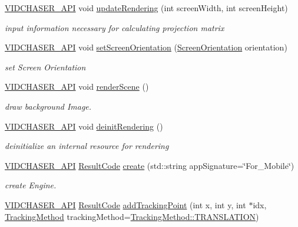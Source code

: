 \begin{DoxyCompactItemize}
\hyperlink{_vid_chaser_a_p_i_8h_abe868bb94e22f611aece5087695f9ef3}{V\+I\+D\+C\+H\+A\+S\+E\+R\+\_\+\+A\+PI} void \hyperlink{namespace_vid_chaser_afbfe1bf77862004fd5da9c95194cc506}{update\+Rendering} (int screen\+Width, int screen\+Height)
\begin{DoxyCompactList}\small\item\em input information necessary for calculating projection matrix \end{DoxyCompactList}\item 
\hyperlink{_vid_chaser_a_p_i_8h_abe868bb94e22f611aece5087695f9ef3}{V\+I\+D\+C\+H\+A\+S\+E\+R\+\_\+\+A\+PI} void \hyperlink{namespace_vid_chaser_a76a9d325e6621b9c163c5154db3f3141}{set\+Screen\+Orientation} (\hyperlink{_vid_chaser_define_8h_a5af96ebe9fdc47f01c3989cf97d41a77}{Screen\+Orientation} orientation)
\begin{DoxyCompactList}\small\item\em set Screen Orientation \end{DoxyCompactList}\item 
\hyperlink{_vid_chaser_a_p_i_8h_abe868bb94e22f611aece5087695f9ef3}{V\+I\+D\+C\+H\+A\+S\+E\+R\+\_\+\+A\+PI} void \hyperlink{namespace_vid_chaser_a68f76b454b274f9be3486792dbfd93a5}{render\+Scene} ()
\begin{DoxyCompactList}\small\item\em draw background Image. \end{DoxyCompactList}\item 
\hyperlink{_vid_chaser_a_p_i_8h_abe868bb94e22f611aece5087695f9ef3}{V\+I\+D\+C\+H\+A\+S\+E\+R\+\_\+\+A\+PI} void \hyperlink{namespace_vid_chaser_a5efdacefec8542b2d3935b87303dd442}{deinit\+Rendering} ()
\begin{DoxyCompactList}\small\item\em deinitialize an internal resource for rendering \end{DoxyCompactList}\item 
\hyperlink{_vid_chaser_a_p_i_8h_abe868bb94e22f611aece5087695f9ef3}{V\+I\+D\+C\+H\+A\+S\+E\+R\+\_\+\+A\+PI} \hyperlink{namespace_vid_chaser_a9a65fd4518380d53654f1af799cbf8ed}{Result\+Code} \hyperlink{namespace_vid_chaser_ac6f30324b16909dc9916e2e80326ada4}{create} (std\+::string app\+Signature=\char`\"{}For\+\_\+\+Mobile\char`\"{})
\begin{DoxyCompactList}\small\item\em create Engine. \end{DoxyCompactList}\item 
\hyperlink{_vid_chaser_a_p_i_8h_abe868bb94e22f611aece5087695f9ef3}{V\+I\+D\+C\+H\+A\+S\+E\+R\+\_\+\+A\+PI} \hyperlink{namespace_vid_chaser_a9a65fd4518380d53654f1af799cbf8ed}{Result\+Code} \hyperlink{namespace_vid_chaser_a3ef5c1fa7f048b2a32cd1d7b2dde1cd4}{add\+Tracking\+Point} (int x, int y, int $\ast$idx, \hyperlink{_vid_chaser_define_8h_ab7550d874bc06c5d36e27af27c7381e9}{Tracking\+Method} tracking\+Method=\hyperlink{_vid_chaser_define_8h_ab7550d874bc06c5d36e27af27c7381e9aecccd1296dcfe0ddcbe5954f37899f19}{Tracking\+Method\+::\+T\+R\+A\+N\+S\+L\+A\+T\+I\+ON})

\end{DoxyCompactItemize}
